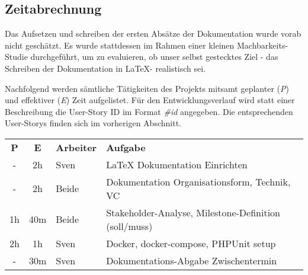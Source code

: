 \subsection{Zeitabrechnung}
Das Aufsetzen und schreiben der ersten Absätze der Dokumentation wurde vorab nicht geschätzt. Es wurde stattdessen im Rahmen einer kleinen Machbarkeits-Studie durchgeführt, um zu evaluieren, ob unser selbst gestecktes Ziel - das Schreiben der Dokumentation in \LaTeX - realistisch sei.

Nachfolgend werden sämtliche Tätigkeiten des Projekts mitsamt geplanter (\emph{P}) und effektiver (\emph{E}) Zeit aufgelistet. Für den Entwicklungsverlauf wird statt einer Beschreibung die User-Story ID im Format \emph{\#id} angegeben. Die entsprechenden User-Storys finden sich im vorherigen Abschnitt.

\vspace{5mm}

\begin{tabular}{ c c l l }
  \textbf{P} & \textbf{E} & \textbf{Arbeiter} & \textbf{Aufgabe} \\
  - & 2h & Sven & LaTeX Dokumentation Einrichten \\
  - & 2h & Beide & Dokumentation Organisationsform, Technik, VC\\
  1h & 40m & Beide & Stakeholder-Analyse, Milestone-Definition (soll/muss) \\
  2h & 1h & Sven & Docker, docker-compose, PHPUnit setup \\
  - & 30m & Sven & Dokumentations-Abgabe Zwischentermin
\end{tabular}
